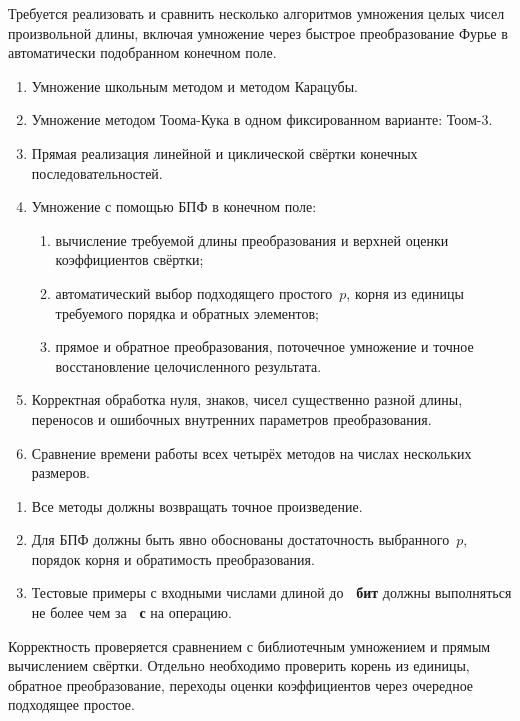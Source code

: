 \documentclass{ca-capstone}
\begin{document}


\goal
Требуется реализовать и сравнить несколько алгоритмов умножения целых чисел произвольной
длины, включая умножение через быстрое преобразование Фурье в автоматически подобранном
конечном поле.

\functionality
\begin{enumerate}
  \item Умножение школьным методом и методом Карацубы.
  \item Умножение методом Тоома-Кука в одном фиксированном варианте: Тоом-3.
  \item Прямая реализация линейной и циклической свёртки конечных последовательностей.
  \item Умножение с помощью БПФ в конечном поле:
    \begin{enumerate}[label=\alph*.]
      \item вычисление требуемой длины преобразования и верхней оценки коэффициентов свёртки;
      \item автоматический выбор подходящего простого~$p$, корня из единицы требуемого
        порядка и обратных элементов;
      \item прямое и обратное преобразования, поточечное умножение и точное восстановление
        целочисленного результата.
    \end{enumerate}
  \item Корректная обработка нуля, знаков, чисел существенно разной длины, переносов и
    ошибочных внутренних параметров преобразования.
  \item Сравнение времени работы всех четырёх методов на числах нескольких размеров.
\end{enumerate}

\requirements
\begin{enumerate}
  \item Все методы должны возвращать точное произведение.
  \item Для БПФ должны быть явно обоснованы достаточность выбранного~$p$, порядок корня и
    обратимость преобразования.
  \item Тестовые примеры с входными числами длиной до \textbf{\ReqBitsMax~бит} должны
    выполняться не более чем за \textbf{\ReqSeconds~с} на операцию.
\end{enumerate}

Корректность проверяется сравнением с библиотечным умножением и прямым вычислением свёртки.
Отдельно необходимо проверить корень из единицы, обратное преобразование, переходы оценки коэффициентов
через очередное подходящее простое.
\end{document}
